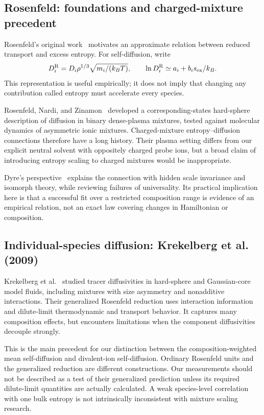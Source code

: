 \documentclass[11pt,a4paper]{article}
\begin{document}
\subsection{Rosenfeld: foundations and charged-mixture precedent}
Rosenfeld's original work~\cite{Rosenfeld1977} motivates an approximate
relation between reduced transport and excess entropy. For self-diffusion,
write
\begin{equation}
D_i^{\rm R}=D_i\rho^{1/3}\sqrt{m_i/(k_BT)},\qquad
\ln D_i^{\rm R}\simeq a_i+b_i s_{\rm ex}/k_B.
\end{equation}
This representation is useful empirically; it does not imply that changing
any contribution called entropy must accelerate every species.

Rosenfeld, Nardi, and Zinamon~\cite{Rosenfeld1995} developed a corresponding-states
hard-sphere description of diffusion in binary dense-plasma mixtures, tested
against molecular dynamics of asymmetric ionic mixtures. Charged-mixture
entropy--diffusion connections therefore have a long history. Their plasma
setting differs from our explicit neutral solvent with oppositely charged
probe ions, but a broad claim of introducing entropy scaling to charged
mixtures would be inappropriate.

Dyre's perspective~\cite{Dyre2018} explains the connection with hidden scale
invariance and isomorph theory, while reviewing failures of universality.
Its practical implication here is that a successful fit over a restricted
composition range is evidence of an empirical relation, not an exact law
covering changes in Hamiltonian or composition.

\subsection{Individual-species diffusion: Krekelberg et al. (2009)}
Krekelberg et al.~\cite{Krekelberg2009} studied tracer diffusivities in
hard-sphere and Gaussian-core model fluids, including mixtures with
size asymmetry and nonadditive interactions. Their generalized Rosenfeld
reduction uses interaction information and dilute-limit thermodynamic and
transport behavior. It captures many composition effects, but encounters
limitations when the component diffusivities decouple strongly.

This is the main precedent for our distinction between the composition-weighted
mean self-diffusion and divalent-ion self-diffusion. Ordinary Rosenfeld units
and the generalized reduction are different constructions. Our measurements
should not be described as a test of their generalized prediction unless
its required dilute-limit quantities are actually calculated. A weak
species-level correlation with one bulk entropy is not intrinsically
inconsistent with mixture scaling research.
\end{document}
